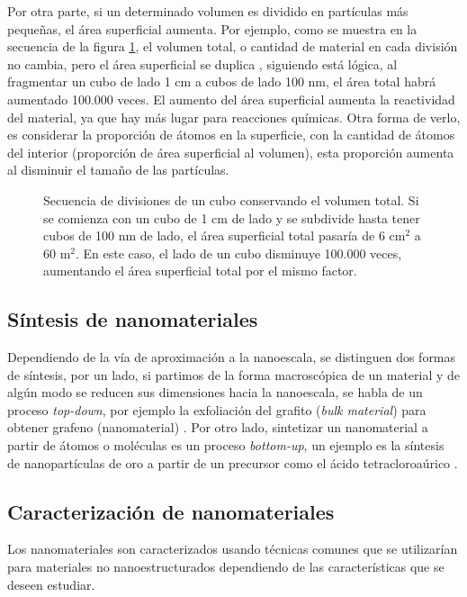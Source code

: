 Por otra parte, si un determinado volumen es dividido en partículas más pequeñas, el área superficial aumenta. Por ejemplo, como se muestra en la secuencia de la figura \ref{fig:area_cubes}, el volumen total, o cantidad de material en cada división no cambia, pero el área superficial se duplica \footnotemark, siguiendo está lógica, al fragmentar un cubo de lado 1 cm a cubos de lado 100 nm, el área total habrá aumentado 100.000 veces. El aumento del área superficial aumenta la reactividad del material, ya que hay más lugar para reacciones químicas. Otra forma de verlo, es considerar la proporción de átomos en la superficie, con la cantidad de átomos del interior (proporción de área superficial al volumen), esta proporción aumenta al disminuir el tamaño de las partículas.


\begin{figure}[h!]
	\centering
	
	\caption[Subdivisiones de un cubo demostrando el aumento de área superficial total]{Secuencia de divisiones de un cubo conservando el volumen total. Si se comienza con un cubo de 1 cm de lado y se subdivide hasta tener cubos de 100 nm de lado, el área superficial total pasaría de 6 $\mathrm{cm^2}$ a 60 $\mathrm{m^2}$. En este caso, el lado de un cubo disminuye 100.000 veces, aumentando el área superficial total por el mismo factor.}
	\label{fig:area_cubes}
\end{figure}

\subsection{Síntesis de nanomateriales}
Dependiendo de la vía de aproximación a la nanoescala, se distinguen dos formas de síntesis, por un lado, si partimos de la forma macroscópica de un material y de algún modo se reducen sus dimensiones hacia la nanoescala, se habla de un proceso \textit{top-down}, por ejemplo la exfoliación del grafito (\textit{bulk material}) para obtener grafeno (nanomaterial) \citep{Novoselov2004}.  Por otro lado, sintetizar un nanomaterial a partir de átomos o moléculas es un proceso \textit{bottom-up}, un ejemplo es la síntesis de nanopartículas de oro a partir de un precursor como el ácido tetracloroaúrico \citep{Daniel2004}.

\subsection{Caracterización de nanomateriales}
Los nanomateriales son caracterizados usando técnicas comunes que se utilizarían para materiales no nanoestructurados dependiendo de las características que se deseen estudiar.
